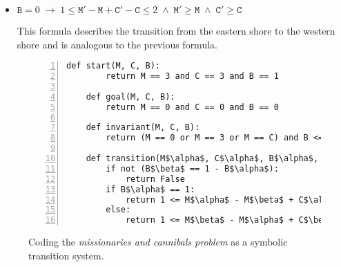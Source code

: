 \begin{enumerate}[(a)]
\begin{itemize}
            If the boat is initially on the western shore, then afterwards the number of missionaries and
            infidels will decrease, as they leave for the eastern shore.  In this case $\texttt{M} - \texttt{M}'$
            is the number of missionaries on the boat, while $\texttt{C} - \texttt{C}'$ is the number of
            infidels.  The sum of these numbers has to be between $1$ and $2$ because the boat can not travel
            empty and can take at most two passengers.
            
      \item $\mathtt{B} = 0 \;\rightarrow\; 1 \leq \mathtt{M}' - \mathtt{M}  + \mathtt{C}' - \mathtt{C} \leq 2 \;\wedge\;
            \mathtt{M}' \geq \mathtt{M} \;\wedge\; \mathtt{C}' \geq \mathtt{C}$

            This formula describes the transition from the eastern shore to the western shore and is analogous
            to the previous formula.
      \end{itemize}
\end{enumerate}

\begin{figure}[!ht]
\centering
\begin{Verbatim}[frame         = lines, 
                 framesep      = 0.3cm, 
                 firstnumber   = 1,
                 numbers       = left,
                 numbersep     = -0.2cm,
                 xleftmargin   = 0.8cm,
                 xrightmargin  = 0.8cm,
                 commandchars  = \\\{\},
                 codes         = {\catcode`$=3\catcode`^=7}
               ] 
    def start(M, C, B):
        return M == 3 and C == 3 and B == 1
    
    def goal(M, C, B):
        return M == 0 and C == 0 and B == 0
    
    def invariant(M, C, B):
        return (M == 0 or M == 3 or M == C) and B <= 1
    
    def transition(M$\alpha$, C$\alpha$, B$\alpha$, M$\beta$, C$\beta$, B$\beta$):
        if not (B$\beta$ == 1 - B$\alpha$):
            return False
        if B$\alpha$ == 1:
            return 1 <= M$\alpha$ - M$\beta$ + C$\alpha$ - C$\beta$ <= 2 and M$\beta$ <= M$\alpha$ and C$\beta$ <= C$\alpha$
        else:
            return 1 <= M$\beta$ - M$\alpha$ + C$\beta$ - C$\alpha$ <= 2 and M$\beta$ >= M$\alpha$ and C$\beta$ >= C$\alpha$
\end{Verbatim}
\vspace*{-0.3cm}
\caption{Coding the \emph{missionaries and cannibals problem} as a symbolic transition system.}
\label{fig:Missionaries-STS.ipynb}
\end{figure}

